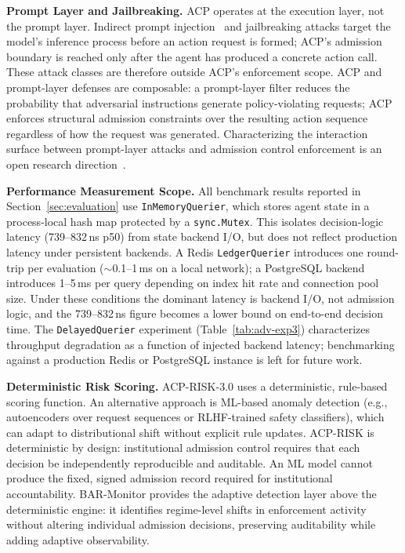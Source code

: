 \documentclass[11pt]{article}
\theoremstyle{definition}
\begin{document}
\textbf{Prompt Layer and Jailbreaking.}
ACP operates at the execution layer, not the prompt layer.
Indirect prompt injection~\cite{greshake2023not} and jailbreaking attacks target the
model's inference process before an action request is formed; ACP's admission boundary
is reached only after the agent has produced a concrete action call.
These attack classes are therefore outside ACP's enforcement scope.
ACP and prompt-layer defenses are composable: a prompt-layer filter reduces the
probability that adversarial instructions generate policy-violating requests; ACP
enforces structural admission constraints over the resulting action sequence regardless
of how the request was generated.
Characterizing the interaction surface between prompt-layer attacks and admission
control enforcement is an open research direction~\cite{debenedetti2024agentdojo}.

\textbf{Performance Measurement Scope.}
All benchmark results reported in Section~\ref{sec:evaluation} use
\texttt{InMemoryQuerier}, which stores agent state in a process-local
hash map protected by a \texttt{sync.Mutex}.
This isolates decision-logic latency (739--832\,ns p50) from state backend I/O,
but does not reflect production latency under persistent backends.
A Redis \texttt{LedgerQuerier} introduces one round-trip per evaluation
($\sim$0.1--1\,ms on a local network); a PostgreSQL backend introduces
1--5\,ms per query depending on index hit rate and connection pool size.
Under these conditions the dominant latency is backend I/O, not admission logic,
and the 739--832\,ns figure becomes a lower bound on end-to-end decision time.
The \texttt{DelayedQuerier} experiment (Table~\ref{tab:adv-exp3}) characterizes
throughput degradation as a function of injected backend latency;
benchmarking against a production Redis or PostgreSQL instance is left for future work.

\textbf{Deterministic Risk Scoring.}
ACP-RISK-3.0 uses a deterministic, rule-based scoring function.
An alternative approach is ML-based anomaly detection (e.g., autoencoders over request
sequences or RLHF-trained safety classifiers), which can adapt to distributional shift
without explicit rule updates.
ACP-RISK is deterministic by design: institutional admission control requires that each
decision be independently reproducible and auditable.
An ML model cannot produce the fixed, signed admission record required for institutional
accountability.
BAR-Monitor provides the adaptive detection layer above the deterministic engine:
it identifies regime-level shifts in enforcement activity without altering individual
admission decisions, preserving auditability while adding adaptive observability.
\end{document}
